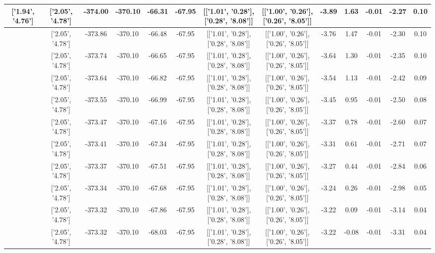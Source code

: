 \begin{table}[htbp]
\begin{adjustbox}{angle=90}
\begin{tabular}{|c|c|c|c|c|c|c|c|c|c|c|c|c|}
 ['1.94', '4.76'] & ['2.05', '4.78'] & -374.00 & -370.10 & -66.31 & -67.95 & [['1.01', '0.28'], ['0.28', '8.08']] & [['1.00', '0.26'], ['0.26', '8.05']] & -3.89 & 1.63 & -0.01 & -2.27 & 0.10\\ \hline
 ['1.95', '4.76'] & ['2.05', '4.78'] & -373.86 & -370.10 & -66.48 & -67.95 & [['1.01', '0.28'], ['0.28', '8.08']] & [['1.00', '0.26'], ['0.26', '8.05']] & -3.76 & 1.47 & -0.01 & -2.30 & 0.10\\ \hline
 ['1.97', '4.77'] & ['2.05', '4.78'] & -373.74 & -370.10 & -66.65 & -67.95 & [['1.01', '0.28'], ['0.28', '8.08']] & [['1.00', '0.26'], ['0.26', '8.05']] & -3.64 & 1.30 & -0.01 & -2.35 & 0.10\\ \hline
 ['1.98', '4.77'] & ['2.05', '4.78'] & -373.64 & -370.10 & -66.82 & -67.95 & [['1.01', '0.28'], ['0.28', '8.08']] & [['1.00', '0.26'], ['0.26', '8.05']] & -3.54 & 1.13 & -0.01 & -2.42 & 0.09\\ \hline
 ['1.99', '4.77'] & ['2.05', '4.78'] & -373.55 & -370.10 & -66.99 & -67.95 & [['1.01', '0.28'], ['0.28', '8.08']] & [['1.00', '0.26'], ['0.26', '8.05']] & -3.45 & 0.95 & -0.01 & -2.50 & 0.08\\ \hline
 ['2.00', '4.77'] & ['2.05', '4.78'] & -373.47 & -370.10 & -67.16 & -67.95 & [['1.01', '0.28'], ['0.28', '8.08']] & [['1.00', '0.26'], ['0.26', '8.05']] & -3.37 & 0.78 & -0.01 & -2.60 & 0.07\\ \hline
 ['2.01', '4.77'] & ['2.05', '4.78'] & -373.41 & -370.10 & -67.34 & -67.95 & [['1.01', '0.28'], ['0.28', '8.08']] & [['1.00', '0.26'], ['0.26', '8.05']] & -3.31 & 0.61 & -0.01 & -2.71 & 0.07\\ \hline
 ['2.02', '4.78'] & ['2.05', '4.78'] & -373.37 & -370.10 & -67.51 & -67.95 & [['1.01', '0.28'], ['0.28', '8.08']] & [['1.00', '0.26'], ['0.26', '8.05']] & -3.27 & 0.44 & -0.01 & -2.84 & 0.06\\ \hline
 ['2.03', '4.78'] & ['2.05', '4.78'] & -373.34 & -370.10 & -67.68 & -67.95 & [['1.01', '0.28'], ['0.28', '8.08']] & [['1.00', '0.26'], ['0.26', '8.05']] & -3.24 & 0.26 & -0.01 & -2.98 & 0.05\\ \hline
 ['2.05', '4.78'] & ['2.05', '4.78'] & -373.32 & -370.10 & -67.86 & -67.95 & [['1.01', '0.28'], ['0.28', '8.08']] & [['1.00', '0.26'], ['0.26', '8.05']] & -3.22 & 0.09 & -0.01 & -3.14 & 0.04\\ \hline
 ['2.06', '4.78'] & ['2.05', '4.78'] & -373.32 & -370.10 & -68.03 & -67.95 & [['1.01', '0.28'], ['0.28', '8.08']] & [['1.00', '0.26'], ['0.26', '8.05']] & -3.22 & -0.08 & -0.01 & -3.31 & 0.04\\ \hline

\end{tabular}
\end{adjustbox}
\end{table}
